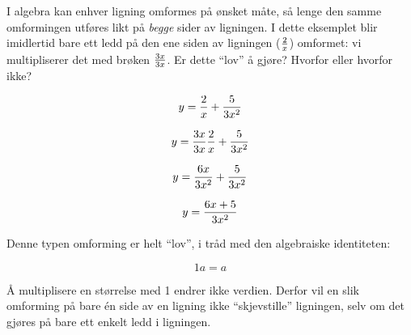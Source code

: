 

I algebra kan enhver ligning omformes på ønsket måte, så lenge den samme omformingen utføres likt på {\it begge} sider av ligningen. I dette eksemplet blir imidlertid bare ett ledd på den ene siden av ligningen (${2 \over x}$) omformet: vi multipliserer det med brøken ${3x \over 3x}$. Er dette ``lov'' å gjøre? Hvorfor eller hvorfor ikke?

$$y = {2 \over x} + {5 \over 3x^2}$$

$$y = {3x \over 3x}{2 \over x} + {5 \over 3x^2}$$

$$y = {6x \over 3x^2} + {5 \over 3x^2}$$

$$y = {{6x + 5} \over 3x^2}$$







Denne typen omforming er helt ``lov'', i tråd med den algebraiske identiteten:

$$1a = a$$







Å multiplisere en størrelse med 1 endrer ikke verdien. Derfor vil en slik omforming på bare én side av en ligning ikke ``skjevstille'' ligningen, selv om det gjøres på bare ett enkelt ledd i ligningen.



